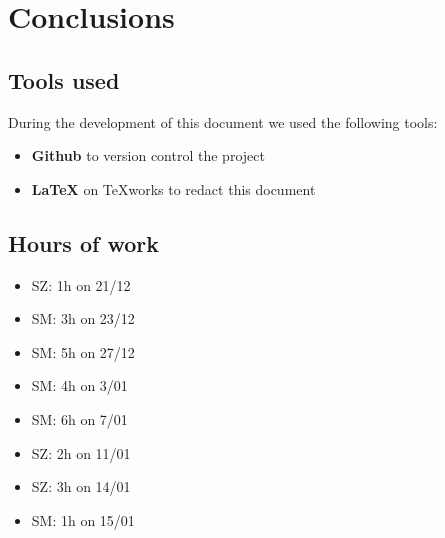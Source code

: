 \documentclass[11pt]{article} %
\begin{document}
\newpage
\section{Conclusions}

\subsection{Tools used}
During the development of this document we used the following tools:
\begin{itemize}
	\item \textbf{Github} to version control the project
	\item \textbf{\LaTeX} on TeXworks to redact this document
\end{itemize}

\subsection{Hours of work}
\begin{itemize}
	\item SZ: 1h on 21/12
	\item SM: 3h on 23/12
	\item SM: 5h on 27/12
	\item SM: 4h on 3/01
	\item SM: 6h on 7/01
	\item SZ: 2h on 11/01
	\item SZ: 3h on 14/01
	\item SM: 1h on 15/01
\end{itemize}
\end{document}
